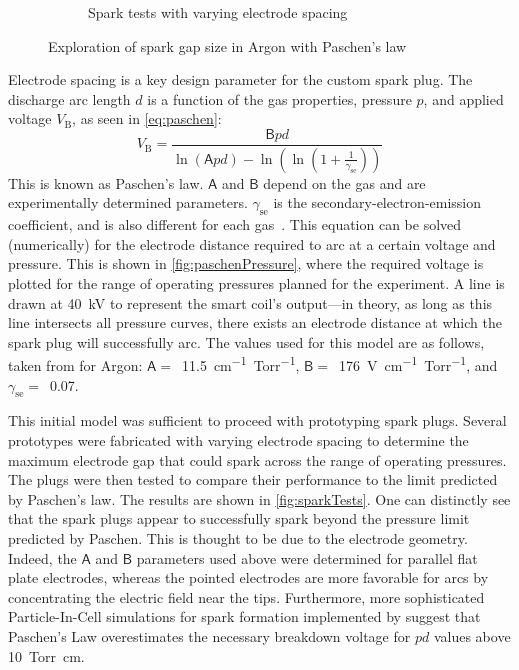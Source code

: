 \begin{figure}[h]
\begin{subfigure}[t]{0.47\textwidth}
                    \caption{Spark tests with varying electrode spacing}
                    \label{fig:sparkTests}
                \end{subfigure}
                \caption{Exploration of spark gap size in Argon with Paschen's law}
                \label{fig:sparking}
            \end{figure}

            Electrode spacing is a key design parameter for the custom spark plug. The discharge arc length $d$ is a function of the gas properties, pressure $p$, and applied voltage $V_\mathrm{B}$, as seen in \autoref{eq:paschen}:
            \begin{equation}
                V_\mathrm{B} = \frac{\mathsf{B} pd}{\ln{(\mathsf{A} pd)}-\ln{\left(\ln{\left(1+\frac{1}{\gamma_\mathrm{se}}\right)}\right)}}
                \label{eq:paschen}
            \end{equation}
            This is known as Paschen's law. $\mathsf{A}$ and $\mathsf{B}$ depend on the gas and are experimentally determined parameters. $\gamma_\mathrm{se}$ is the secondary-electron-emission coefficient, and is also different for each gas~\cite{liebermanPrinciplesPlasmaDischarges2005}. This equation can be solved (numerically) for the electrode distance required to arc at a certain voltage and pressure. This is shown in \autoref{fig:paschenPressure}, where the required voltage is plotted for the range of operating pressures planned for the experiment. A line is drawn at \qty{40}{kV} to represent the smart coil's output---in theory, as long as this line intersects all pressure curves, there exists an electrode distance at which the spark plug will successfully arc. The values used for this model are as follows, taken from \textcite{liebermanPrinciplesPlasmaDischarges2005,theisComputingPaschenCurve2021} for Argon: $\mathsf{A} =$~\qty{11.5}{cm^{-1}.Torr^{-1}}, $\mathsf{B} =$~\qty{176}{V.cm^{-1}.Torr^{-1}}, and $\gamma_\mathrm{se} =$~0.07.

            This initial model was sufficient to proceed with prototyping spark plugs. Several prototypes were fabricated with varying electrode spacing to determine the maximum electrode gap that could spark across the range of operating pressures. The plugs were then tested to compare their performance to the limit predicted by Paschen's law. The results are shown in \autoref{fig:sparkTests}. One can distinctly see that the spark plugs appear to successfully spark beyond the pressure limit predicted by Paschen. This is thought to be due to the electrode geometry. Indeed, the $\mathsf{A}$ and $\mathsf{B}$ parameters used above were determined for parallel flat plate electrodes, whereas the pointed electrodes are more favorable for arcs by concentrating the electric field near the tips. Furthermore, more sophisticated Particle-In-Cell simulations for spark formation implemented by \textcite{theisComputingPaschenCurve2021} suggest that Paschen's Law overestimates the necessary breakdown voltage for $pd$ values above \qty{10}{Torr.cm}.

